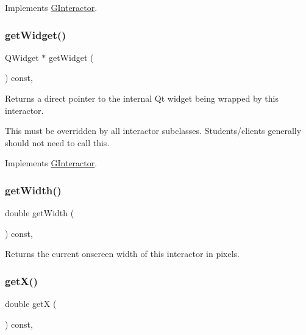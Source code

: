 Implements \mbox{\hyperlink{classGInteractor_a44c407a54a20dd0f2fff30338289299d}{G\+Interactor}}.

\mbox{\label{classGBrowserPane_a3b33a602b31a6b809d020535a59db3b4}} 
\subsubsection{\texorpdfstring{get\+Widget()}{getWidget()}}
{\footnotesize\ttfamily Q\+Widget $\ast$ get\+Widget (\begin{DoxyParamCaption}{ }\end{DoxyParamCaption}) const\hspace{0.3cm}{\ttfamily [override]}, {\ttfamily [virtual]}}



Returns a direct pointer to the internal Qt widget being wrapped by this interactor. 

This must be overridden by all interactor subclasses. Students/clients generally should not need to call this. 

Implements \mbox{\hyperlink{classGInteractor}{G\+Interactor}}.

\mbox{\label{classGInteractor_a0ed2965abd4f5701d2cadf71239faf19}} 
\subsubsection{\texorpdfstring{get\+Width()}{getWidth()}}
{\footnotesize\ttfamily double get\+Width (\begin{DoxyParamCaption}{ }\end{DoxyParamCaption}) const\hspace{0.3cm}{\ttfamily [virtual]}, {\ttfamily [inherited]}}



Returns the current onscreen width of this interactor in pixels. 

\mbox{\label{classGInteractor_a344385751bee0720059403940d57a13e}} 
\subsubsection{\texorpdfstring{get\+X()}{getX()}}
{\footnotesize\ttfamily double getX (\begin{DoxyParamCaption}{ }\end{DoxyParamCaption}) const\hspace{0.3cm}{\ttfamily [virtual]}, {\ttfamily [inherited]}}



